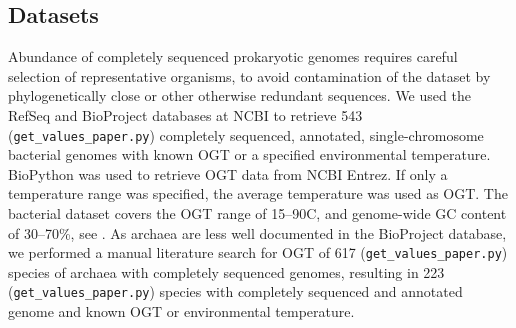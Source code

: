 \documentclass[10pt,letterpaper]{article}
\begin{document}


\subsection*{Datasets}
Abundance of completely sequenced prokaryotic genomes requires careful selection of representative organisms, to avoid contamination of the dataset by phylogenetically close or other otherwise redundant sequences.
We used the RefSeq and BioProject databases at NCBI to retrieve 543 (\texttt{get\_values\_paper.py}) completely sequenced, annotated, single-chromosome bacterial genomes with known OGT or a specified environmental temperature. BioPython was used to retrieve OGT data from NCBI Entrez. If only a temperature range was specified, the average temperature was used as OGT. The bacterial dataset covers the OGT range of 15--90C, and genome-wide GC content of 30--70\%, see .
As archaea are less well documented in the BioProject database, we performed a manual literature search for OGT of 617 (\texttt{get\_values\_paper.py}) species of archaea with completely sequenced genomes, resulting in 223 (\texttt{get\_values\_paper.py})  species with completely sequenced and annotated genome and known OGT or environmental temperature. 
\end{document}
